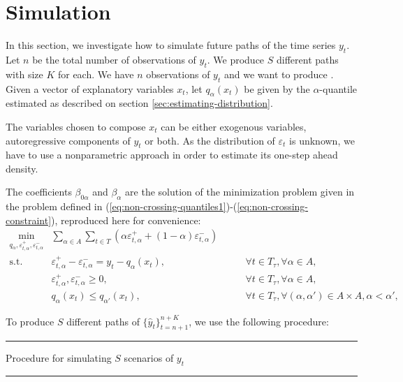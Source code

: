 \section{Simulation}
\label{sec:simulation}

In this section, we investigate how to simulate future paths of the time series $y_t$. 
Let $n$ be the total number of observations of $y_t$. We produce $S$ different paths with size $K$ for each. 
We have $n$ observations of $y_t$ and we want to produce . Given a vector of explanatory variables $x_t$, let $q_\alpha(x_t)$ be given by the $\alpha$-quantile estimated as described on section \ref{sec:estimating-distribution}.

The variables chosen to compose $x_t$ can be either exogenous variables, autoregressive components of $y_t$ or both. As the distribution of $\varepsilon_t$ is unknown, we have to use a nonparametric approach in order to estimate its one-step ahead density.

The coefficients $\beta_{0 \alpha}$ and $\beta_{\alpha}$ are the solution of the minimization problem given in the problem defined in (\ref{eq:non-crossing-quantiles1})-(\ref{eq:non-crossing-constraint}), reproduced here for convenience:
\begin{eqnarray}
\min_{q_\alpha,\varepsilon_{t,\alpha}^{+}, \varepsilon_{t,\alpha}^{-}} &  \sum_{\alpha \in A} \sum_{t \in T}\left(\alpha \varepsilon_{t,\alpha}^{+}+(1-\alpha)\varepsilon_{t,\alpha}^{-}\right) &  \\
\mbox{s.t. } & \varepsilon_{t,\alpha}^{+}-\varepsilon_{t,\alpha}^{-}=y_{t} - q_\alpha(x_{t}), & \qquad\forall t \in T_\tau,\forall \alpha \in A,\\
& \varepsilon_{t,\alpha}^+,\varepsilon_{t,\alpha}^- \geq 0, & \qquad\forall t \in T_\tau,\forall \alpha \in A,\\ 
& q_{\alpha}(x_t) \leq q_{\alpha'}(x_t), & \qquad \forall t \in T_\tau, \forall (\alpha, \alpha') \in A \times A,  \alpha < \alpha', 
\end{eqnarray}

To produce $S$ different paths of $\{ \hat{y}_t \}_{t=n+1}^{n+K}$, we use the following procedure:

\noindent\rule{\textwidth}{3pt}

Procedure for simulating $S$ scenarios of $y_t$

\noindent\rule{\textwidth}{1pt}

